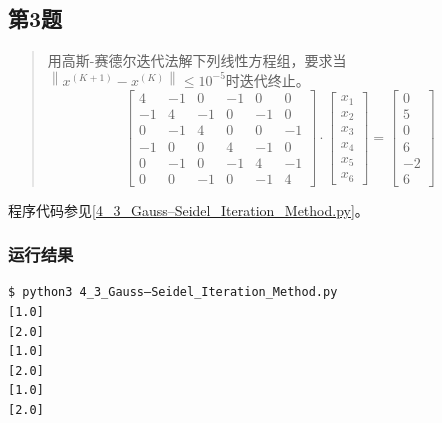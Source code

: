 
\subsection{第3题}
\begin{quote}
    {\kaishu
        用高斯-赛德尔迭代法解下列线性方程组，要求当$\left\|x^{(K+1)}-x^{(K)}\right\| \leq 10^{-5}$时迭代终止。
        \begin{equation}
            \left[ \begin{array}{rrrrrrr}
                {4} & {-1} & {0} & {-1} & {0} & {0} \\ {-1} & {4} & {-1} & {0} & {-1} & {0} \\ {0} & {-1} & {4} & {0} & {0} & {-1} \\ {-1} & {0} & {0} & {4} & {-1} & {0} \\ {0} & {-1} & {0} & {-1} & {4} & {-1} \\ {0} & {0} & {-1} & {0} & {-1} & {4}\end{array}\right] \cdot \left[ \begin{array}{c}{x_{1}} \\ {x_{2}} \\ {x_{3}} \\ {x_{4}} \\ {x_{5}} \\ {x_{6}}\end{array}\right]=\left[ \begin{array}{r}{0} \\ {5} \\ {0} \\ {6} \\ {-2} \\ {6}
            \end{array}\right]
        \end{equation}
    }
\end{quote}

程序代码参见\ref{4_3_Gauss–Seidel_Iteration_Method.py}。

\subsubsection{运行结果}

\begin{lstlisting}[style = bash]
$ python3 4_3_Gauss–Seidel_Iteration_Method.py 
[1.0]
[2.0]
[1.0]
[2.0]
[1.0]
[2.0]
\end{lstlisting}

